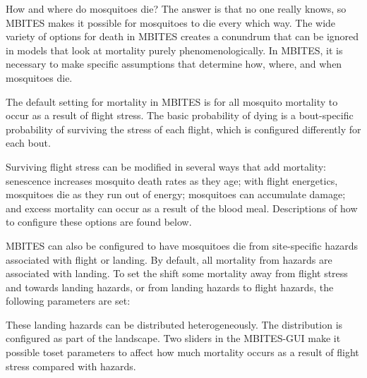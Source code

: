 \documentclass{article}
\newcommand{\ie}{{\em i.e., }}
\begin{document}
How and where do mosquitoes die? The answer is that no one really knows, so MBITES makes it possible for mosquitoes to die every which way. The wide variety of options for death in MBITES creates a conundrum that can be ignored in models that look at mortality purely phenomenologically. In MBITES, it is necessary to make specific assumptions that determine how, where, and when mosquitoes die. 

The default setting for mortality in MBITES is for all mosquito mortality to occur as a result of flight stress. The basic probability of dying is a bout-specific probability of surviving the stress of each flight, which is configured differently for each bout. 
%
%
Surviving flight stress can be modified in several ways that add mortality: senescence increases mosquito death rates as they age; with flight energetics, mosquitoes die as they run out of energy; mosquitoes can accumulate damage; and excess mortality can occur as a result of the blood meal. Descriptions of how to configure these options are found below.

MBITES can also be configured to have mosquitoes die from site-specific hazards associated with flight or landing. By default, all mortality from hazards are associated with landing. To set the shift some mortality away from flight stress and towards landing hazards, or from landing hazards to flight hazards, the following parameters are set:  
%
%
These landing hazards can be distributed heterogeneously. The distribution is configured as part of the landscape. Two sliders in the MBITES-GUI make it possible toset parameters to affect how much mortality occurs as a result of flight stress compared with hazards. 
\end{document}
